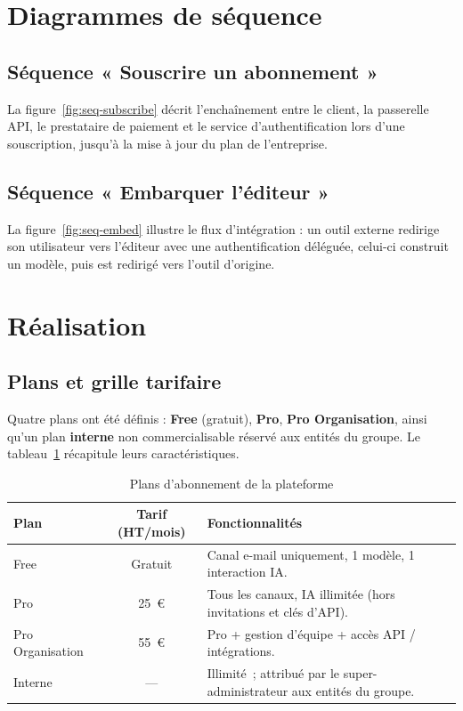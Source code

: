 \section{Diagrammes de séquence}

\subsection{Séquence « Souscrire un abonnement »}
La figure~\ref{fig:seq-subscribe} décrit l'enchaînement entre le client, la
passerelle API, le prestataire de paiement et le service
d'authentification lors d'une souscription, jusqu'à la mise à jour du plan
de l'entreprise.


\subsection{Séquence « Embarquer l'éditeur »}
La figure~\ref{fig:seq-embed} illustre le flux d'intégration : un outil
externe redirige son utilisateur vers l'éditeur avec une authentification
déléguée, celui-ci construit un modèle, puis est redirigé vers l'outil
d'origine.


\section{Réalisation}

\subsection{Plans et grille tarifaire}
Quatre plans ont été définis : \textbf{Free} (gratuit), \textbf{Pro},
\textbf{Pro Organisation}, ainsi qu'un plan \textbf{interne} non
commercialisable réservé aux entités du groupe. Le
tableau~\ref{tab:plans} récapitule leurs caractéristiques.

\begin{table}[H]
\centering
\caption{Plans d'abonnement de la plateforme}
\label{tab:plans}
\small
\begin{tabularx}{\linewidth}{lcX}
\toprule
\textbf{Plan} & \textbf{Tarif (HT/mois)} & \textbf{Fonctionnalités} \\
\midrule
Free & Gratuit & Canal e-mail uniquement, 1 modèle, 1 interaction IA. \\
Pro & 25~€ & Tous les canaux, IA illimitée (hors invitations et clés d'API). \\
Pro Organisation & 55~€ & Pro + gestion d'équipe + accès API / intégrations. \\
Interne & — & Illimité~; attribué par le super-administrateur aux entités du groupe. \\
\bottomrule
\end{tabularx}
\end{table}


